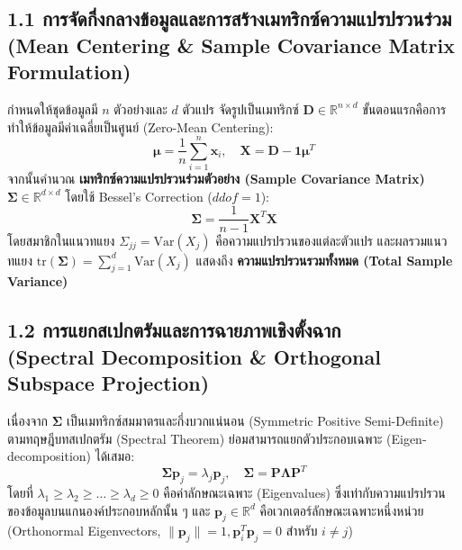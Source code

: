 \documentclass[12pt,a4paper]{article}
\begin{document}
\subsection*{1.1 การจัดกึ่งกลางข้อมูลและการสร้างเมทริกซ์ความแปรปรวนร่วม\\ \normalsize(Mean Centering \& Sample Covariance Matrix Formulation)}
กำหนดให้ชุดข้อมูลมี $n$ ตัวอย่างและ $d$ ตัวแปร จัดรูปเป็นเมทริกซ์ $\mathbf{D} \in \mathbb{R}^{n \times d}$ ขั้นตอนแรกคือการทำให้ข้อมูลมีค่าเฉลี่ยเป็นศูนย์ (Zero-Mean Centering):
\begin{equation}
    \boldsymbol{\mu} = \frac{1}{n} \sum_{i=1}^n \mathbf{x}_i, \quad \mathbf{X} = \mathbf{D} - \mathbf{1}\boldsymbol{\mu}^T
\end{equation}
จากนั้นคำนวณ \textbf{เมทริกซ์ความแปรปรวนร่วมตัวอย่าง (Sample Covariance Matrix)} $\boldsymbol{\Sigma} \in \mathbb{R}^{d \times d}$ โดยใช้ Bessel's Correction ($ddof=1$):
\begin{equation}
    \boldsymbol{\Sigma} = \frac{1}{n-1} \mathbf{X}^T \mathbf{X}
\end{equation}
โดยสมาชิกในแนวทแยง $\Sigma_{jj} = \text{Var}(X_j)$ คือความแปรปรวนของแต่ละตัวแปร และผลรวมแนวทแยง $\text{tr}(\boldsymbol{\Sigma}) = \sum_{j=1}^d \text{Var}(X_j)$ แสดงถึง \textbf{ความแปรปรวนรวมทั้งหมด (Total Sample Variance)}

\subsection*{1.2 การแยกสเปกตรัมและการฉายภาพเชิงตั้งฉาก\\ \normalsize(Spectral Decomposition \& Orthogonal Subspace Projection)}
เนื่องจาก $\boldsymbol{\Sigma}$ เป็นเมทริกซ์สมมาตรและกึ่งบวกแน่นอน (Symmetric Positive Semi-Definite) ตามทฤษฎีบทสเปกตรัม (Spectral Theorem) ย่อมสามารถแยกตัวประกอบเฉพาะ (Eigen-decomposition) ได้เสมอ:
\begin{equation}
    \boldsymbol{\Sigma} \mathbf{p}_j = \lambda_j \mathbf{p}_j, \quad \boldsymbol{\Sigma} = \mathbf{P} \boldsymbol{\Lambda} \mathbf{P}^T
\end{equation}
โดยที่ $\lambda_1 \ge \lambda_2 \ge \dots \ge \lambda_d \ge 0$ คือค่าลักษณะเฉพาะ (Eigenvalues) ซึ่งเท่ากับความแปรปรวนของข้อมูลบนแกนองค์ประกอบหลักนั้น ๆ และ $\mathbf{p}_j \in \mathbb{R}^d$ คือเวกเตอร์ลักษณะเฉพาะหนึ่งหน่วย (Orthonormal Eigenvectors, $\|\mathbf{p}_j\| = 1, \mathbf{p}_i^T \mathbf{p}_j = 0$ สำหรับ $i \ne j$)
\end{document}
